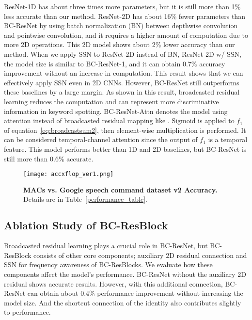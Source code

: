 \documentclass[a4paper]{article}
\begin{document}
ResNet-1D has about three times more parameters, but it is still more than 1\% less accurate than our method. ResNet-2D has about 16\% fewer parameters than BC-ResNet by using batch normalization (BN) between depthwise convolution and pointwise convolution, and it requires a higher amount of computation due to more 2D operations. This 2D model shows about 2\% lower accuracy than our method. When we apply SSN to ResNet-2D instead of BN, ResNet-2D w/ SSN, the model size is similar to BC-ResNet-1, and it can obtain 0.7\% accuracy improvement without an increase in computation. This result shows that we can effectively apply SSN even in 2D CNNs. However, BC-ResNet still outperforms these baselines by a large margin. As shown in this result, broadcasted residual learning reduces the computation and can represent more discriminative information in keyword spotting.
BC-ResNet-Attn denotes the model using attention instead of broadcasted residual mapping like \cite{hu2018squeeze, lee2020urnet}. Sigmoid is applied to $f_1$ of equation~\ref{eq:broadcastsum2}, then element-wise multiplication is performed. It can be considered temporal-channel attention since the output of $f_1$ is a temporal feature. This model performs better than 1D and 2D baselines, but BC-ResNet is still more than 0.6\% accurate.

\begin{figure}[t]
  \centering
  \texttt{[image: accxflop\_ver1.png]}
  \vskip -0.05in
  \caption{\textbf{MACs vs. Google speech command dataset v2 Accuracy.}  Details are in Table~\ref{performance_table}.}
  \label{accxflop}
\end{figure}

\subsection{Ablation Study of BC-ResBlock}
Broadcasted residual learning plays a crucial role in BC-ResNet, but BC-ResBlock consists of other core components; auxiliary 2D residual connection and SSN for frequency awareness of BC-ResBlocks.
We evaluate how these components affect the model's performance.
BC-ResNet without the auxiliary 2D residual shows accurate results.
However, with
this additional connection, BC-ResNet can obtain about 0.4\% performance improvement without increasing the model size. And the shortcut connection of the identity also contributes slightly to performance.
\end{document}
